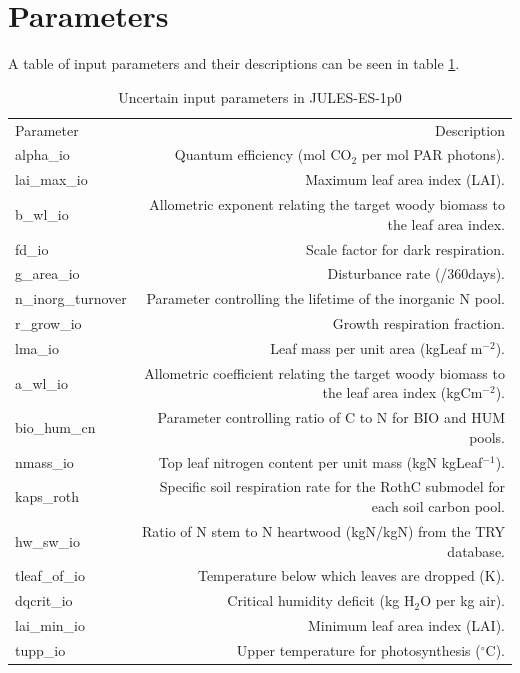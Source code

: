 \documentclass[gmd, manuscript]{copernicus}
\begin{document}
\appendix

\section{Parameters}\label{sec:app_parameters}

A table of input parameters and their descriptions can be seen in table \ref{table:Parameters}.
\begin{table}[t]
\caption{Uncertain input parameters in JULES-ES-1p0}
\label{table:Parameters}
\begin{tabular}{l r}
\tophline
Parameter & Description  \\ 
\middlehline

alpha\_io & Quantum efficiency (mol CO$_2$ per mol PAR photons). \\ 
  lai\_max\_io & Maximum leaf area index (LAI). \\ 
  b\_wl\_io & Allometric exponent relating the target woody biomass to the leaf area index.\\ 
  fd\_io & Scale factor for dark respiration.\\ 
  g\_area\_io &  Disturbance rate (/360days).\\ 
  n\_inorg\_turnover & Parameter controlling the lifetime of the inorganic N pool. \\ 
  r\_grow\_io & Growth respiration fraction.\\ 
  lma\_io & Leaf mass per unit area (kgLeaf m$^{-2}$). \\ 
  a\_wl\_io & Allometric coefficient relating the target woody biomass to the leaf area index (kgCm$^{-2}$). \\ 
  bio\_hum\_cn &  Parameter controlling ratio of C to N for BIO and HUM pools.\\ 
  nmass\_io &  Top leaf nitrogen content per unit mass (kgN kgLeaf$^{-1}$).\\ 
  kaps\_roth &  Specific soil respiration rate for the RothC submodel for each soil carbon pool.\\ 
  hw\_sw\_io & Ratio of N stem to N heartwood (kgN/kgN) from the TRY database. \\ 
  tleaf\_of\_io & Temperature below which leaves are dropped (K).\\ 
  dqcrit\_io & Critical humidity deficit (kg H$_2$O per kg air). \\ 
  lai\_min\_io & Minimum leaf area index (LAI). \\ 
  tupp\_io & Upper temperature for photosynthesis ($^\circ$C). \\ 

\end{tabular}
\end{table}
\end{document}
